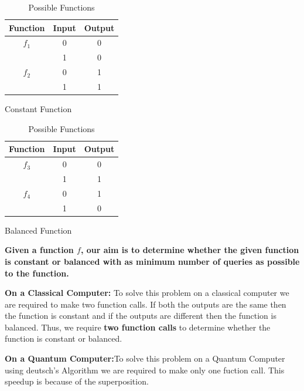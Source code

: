 \documentclass[12pt, oneside]{book}
\theoremstyle{definition}
\theoremstyle{definition}
\theoremstyle{remark}
\begin{document}
\begin{table}[h]
    \centering
     \begin{subtable}[b]{0.45\linewidth}
        \centering
          \begin{tabular}{|c|c|c|}
            \hline
             Function & Input & Output \\
            \hline
              $f_1$& 0 & 0 \\
              & 1 & 0 \\
             \hline
               $f_2$& 0 & 1 \\
               & 1 & 1 \\
              \hline
           \end{tabular}
           \caption{Constant Function}
        \end{subtable}%
     \begin{subtable}[b]{0.45\linewidth}
            \centering
            \begin{tabular}{|c|c|c|}
                \hline
                Function & Input & Output \\
                \hline
                $f_3$& 0 & 0 \\
                & 1 & 1 \\
                \hline
                $f_4$& 0 & 1 \\
                & 1 & 0 \\
                \hline
            \end{tabular}
            \caption{Balanced Function}
        \end{subtable}
        \caption{Possible Functions}
        \label{tab:Deutsch}
\end{table}

\textbf{Given a function $f$, our aim is to determine whether the given function is constant or balanced with as minimum number of queries as possible to the function.}

\textbf{On a Classical Computer: }To solve this problem on a classical computer we are required to make two function calls. If both the outputs are the same 
then the function is constant and if the outputs are different then the function is balanced. Thus, we require \textbf{two function calls} to determine whether the function is constant or balanced.

\textbf{On a Quantum Computer:}To solve this problem on a Quantum Computer using deutsch's Algorithm we are required to make only one fuction call. This speedup is because of the superposition.
\end{document}
